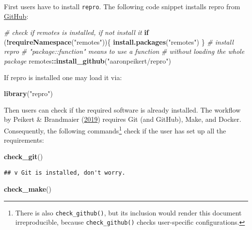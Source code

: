 \documentclass[12pt,a4paper,]{article}
\newenvironment{Shaded}{\begin{snugshade}}{\end{snugshade}}
\newcommand{\CommentTok}[1]{\textcolor[rgb]{0.56,0.35,0.01}{\textit{#1}}}
\newcommand{\ControlFlowTok}[1]{\textcolor[rgb]{0.13,0.29,0.53}{\textbf{#1}}}
\newcommand{\KeywordTok}[1]{\textcolor[rgb]{0.13,0.29,0.53}{\textbf{#1}}}
\newcommand{\NormalTok}[1]{#1}
\newcommand{\OperatorTok}[1]{\textcolor[rgb]{0.81,0.36,0.00}{\textbf{#1}}}
\newcommand{\StringTok}[1]{\textcolor[rgb]{0.31,0.60,0.02}{#1}}
\begin{document}
First users have to install \texttt{repro}. The following code snippet installs repro from \href{https://github.com/aaronpeikert/repro}{GitHub}:

\begin{Shaded}
\begin{Highlighting}[]
\CommentTok{# check if remotes is installed, if not install it}
\ControlFlowTok{if}\NormalTok{ (}\OperatorTok{!}\KeywordTok{requireNamespace}\NormalTok{(}\StringTok{"remotes"}\NormalTok{))\{}
  \KeywordTok{install.packages}\NormalTok{(}\StringTok{"remotes"}\NormalTok{)}
\NormalTok{\}}
\CommentTok{# install repro}
\CommentTok{# "package::function" means to use a function}
\CommentTok{# without loading the whole package}
\NormalTok{remotes}\OperatorTok{::}\KeywordTok{install_github}\NormalTok{(}\StringTok{"aaronpeikert/repro"}\NormalTok{)}
\end{Highlighting}
\end{Shaded}

If repro is installed one may load it via:

\begin{Shaded}
\begin{Highlighting}[]
\KeywordTok{library}\NormalTok{(}\StringTok{"repro"}\NormalTok{)}
\end{Highlighting}
\end{Shaded}

Then users can check if the required software is already installed.
The workflow by Peikert \& Brandmaier (\protect\hyperlink{ref-peikertReproducibleDataAnalysis2019}{2019}) requires Git (and GitHub), Make, and Docker.
Consequently, the following commands\footnote{There is also \texttt{check\_github()}, but its inclusion would render this document irreproducible, because \texttt{check\_github()} checks user-specific configurations.} check if the user has set up all the requirements:

\begin{Shaded}
\begin{Highlighting}[]
\KeywordTok{check_git}\NormalTok{()}
\end{Highlighting}
\end{Shaded}

\begin{verbatim}
## v Git is installed, don't worry.
\end{verbatim}

\begin{Shaded}
\begin{Highlighting}[]
\KeywordTok{check_make}\NormalTok{()}
\end{Highlighting}
\end{Shaded}
\end{document}
